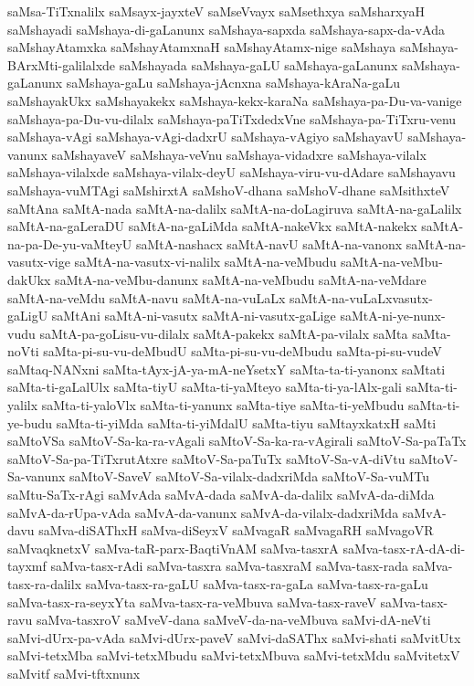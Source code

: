 {saMsa-TiTxnalilx
saMsayx-jayxteV
saMseVvayx
saMsethxya
saMsharxyaH
saMshayadi
saMshaya-di-gaLanunx
saMshaya-sapxda
saMshaya-sapx-da-vAda
saMshayAtamxka
saMshayAtamxnaH
saMshayAtamx-nige
saMshaya
saMshaya-BArxMti-galilalxde
saMshayada
saMshaya-gaLU
saMshaya-gaLanunx
saMshaya-gaLanunx
saMshaya-gaLu
saMshaya-jAcnxna
saMshaya-kAraNa-gaLu
saMshayakUkx
saMshayakekx
saMshaya-kekx-karaNa
saMshaya-pa-Du-va-vanige
saMshaya-pa-Du-vu-dilalx
saMshaya-paTiTxdedxVne
saMshaya-pa-TiTxru-venu
saMshaya-vAgi
saMshaya-vAgi-dadxrU
saMshaya-vAgiyo
saMshayavU
saMshaya-vanunx
saMshayaveV
saMshaya-veVnu
saMshaya-vidadxre
saMshaya-vilalx
saMshaya-vilalxde
saMshaya-vilalx-deyU
saMshaya-viru-vu-dAdare
saMshayavu
saMshaya-vuMTAgi
saMshirxtA
saMshoV-dhana
saMshoV-dhane
saMsithxteV
saMtAna
saMtA-nada
saMtA-na-dalilx
saMtA-na-doLagiruva
saMtA-na-gaLalilx
saMtA-na-gaLeraDU
saMtA-na-gaLiMda
saMtA-nakeVkx
saMtA-nakekx
saMtA-na-pa-De-yu-vaMteyU
saMtA-nashacx
saMtA-navU
saMtA-na-vanonx
saMtA-na-vasutx-vige
saMtA-na-vasutx-vi-nalilx
saMtA-na-veMbudu
saMtA-na-veMbu-dakUkx
saMtA-na-veMbu-danunx
saMtA-na-veMbudu
saMtA-na-veMdare
saMtA-na-veMdu
saMtA-navu
saMtA-na-vuLaLx
saMtA-na-vuLaLxvasutx-gaLigU
saMtAni
saMtA-ni-vasutx
saMtA-ni-vasutx-gaLige
saMtA-ni-ye-nunx-vudu
saMtA-pa-goLisu-vu-dilalx
saMtA-pakekx
saMtA-pa-vilalx
saMta
saMta-noVti
saMta-pi-su-vu-deMbudU
saMta-pi-su-vu-deMbudu
saMta-pi-su-vudeV
saMtaq-NANxni
saMta-tAyx-jA-ya-mA-neYsetxY
saMta-ta-ti-yanonx
saMtati
saMta-ti-gaLalUlx
saMta-tiyU
saMta-ti-yaMteyo
saMta-ti-ya-lAlx-gali
saMta-ti-yalilx
saMta-ti-yaloVlx
saMta-ti-yanunx
saMta-tiye
saMta-ti-yeMbudu
saMta-ti-ye-budu
saMta-ti-yiMda
saMta-ti-yiMdalU
saMta-tiyu
saMtayxkatxH
saMti
saMtoVSa
saMtoV-Sa-ka-ra-vAgali
saMtoV-Sa-ka-ra-vAgirali
saMtoV-Sa-paTaTx
saMtoV-Sa-pa-TiTxrutAtxre
saMtoV-Sa-paTuTx
saMtoV-Sa-vA-diVtu
saMtoV-Sa-vanunx
saMtoV-SaveV
saMtoV-Sa-vilalx-dadxriMda
saMtoV-Sa-vuMTu
saMtu-SaTx-rAgi
saMvAda
saMvA-dada
saMvA-da-dalilx
saMvA-da-diMda
saMvA-da-rUpa-vAda
saMvA-da-vanunx
saMvA-da-vilalx-dadxriMda
saMvA-davu
saMva-diSAThxH
saMva-diSeyxV
saMvagaR
saMvagaRH
saMvagoVR
saMvaqknetxV
saMva-taR-parx-BaqtiVnAM
saMva-tasxrA
saMva-tasx-rA-dA-di-tayxmf
saMva-tasx-rAdi
saMva-tasxra
saMva-tasxraM
saMva-tasx-rada
saMva-tasx-ra-dalilx
saMva-tasx-ra-gaLU
saMva-tasx-ra-gaLa
saMva-tasx-ra-gaLu
saMva-tasx-ra-seyxYta
saMva-tasx-ra-veMbuva
saMva-tasx-raveV
saMva-tasx-ravu
saMva-tasxroV
saMveV-dana
saMveV-da-na-veMbuva
saMvi-dA-neVti
saMvi-dUrx-pa-vAda
saMvi-dUrx-paveV
saMvi-daSAThx
saMvi-shati
saMvitUtx
saMvi-tetxMba
saMvi-tetxMbudu
saMvi-tetxMbuva
saMvi-tetxMdu
saMvitetxV
saMvitf
saMvi-tftxnunx
}
